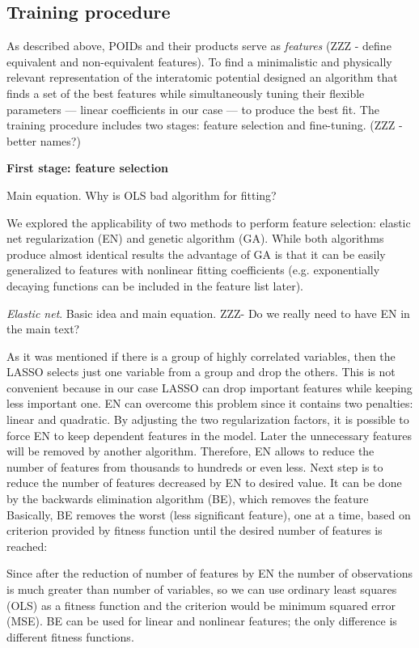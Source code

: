 \documentclass[aps,prl,reprint,amsmath,amssymb,nature]{revtex4-1}
\begin{document}
\subsection{Training procedure} 

As described above, POIDs and their products serve as \textit{features} (ZZZ - define equivalent and non-equivalent features). 
To find a minimalistic and physically relevant representation of the interatomic potential designed an algorithm that finds a set of the best features while simultaneously tuning their flexible parameters --- linear coefficients in our case --- to produce the best fit. 
The training procedure includes two stages: feature selection and fine-tuning. (ZZZ - better names?)

\textbf{First stage: feature selection}

Main equation. Why is OLS bad algorithm for fitting?

We explored the applicability of two methods to perform feature selection: elastic net regularization (EN) and genetic algorithm (GA). 
While both algorithms produce almost identical results the advantage of GA is that it can be easily generalized to features with nonlinear fitting coefficients (e.g. exponentially decaying functions can be included in the feature list later).

\textit{Elastic net}. Basic idea and main equation. ZZZ- Do we really need to have EN in the main text?

As it was mentioned if there is a group of highly correlated variables, 
then the LASSO selects just one variable from a group and drop the 
others. This is not convenient because in our case LASSO can drop 
important features while keeping less important one. EN can overcome 
this problem since it contains two penalties: linear and quadratic. By 
adjusting the two regularization factors, it is possible to force EN to 
keep dependent features in the model. Later the unnecessary features 
will be removed by another algorithm. Therefore, EN allows to reduce the 
number of features from thousands to hundreds or even less. Next step is 
to reduce the number of features decreased by EN to desired value. It 
can be done by the backwards elimination algorithm (BE), which removes 
the feature Basically, BE removes the worst (less significant feature), 
one at a time, based on criterion provided by fitness function until the desired number of features is reached:

Since after the reduction of number of features by EN the number of 
observations is much greater than number of variables, so we can use 
ordinary least squares (OLS) as a fitness function and the criterion 
would be minimum squared error (MSE). BE can be used for linear and 
nonlinear features; the only difference is different fitness functions.
\end{document}
